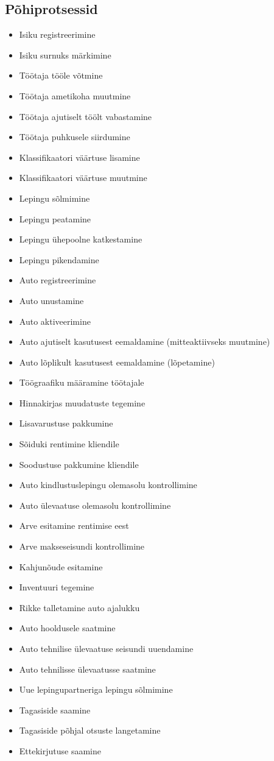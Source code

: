 \subsection{Põhiprotsessid}
\begin{itemize}
	\item Isiku registreerimine
	\item Isiku surnuks märkimine
	\item Töötaja tööle võtmine
	\item Töötaja ametikoha muutmine
	\item Töötaja ajutiselt töölt vabastamine
	\item Töötaja puhkusele siirdumine
	\item Klassifikaatori väärtuse lisamine
	\item Klassifikaatori väärtuse muutmine
	\item Lepingu sõlmimine
	\item Lepingu peatamine
	\item Lepingu ühepoolne katkestamine
	\item Lepingu pikendamine
	\item Auto registreerimine
	\item Auto unustamine
	\item Auto aktiveerimine
	\item Auto ajutiselt kasutusest eemaldamine (mitteaktiivseks muutmine)
	\item Auto lõplikult kasutusest eemaldamine (lõpetamine)
	\item Töögraafiku määramine töötajale
	\item Hinnakirjas muudatuste tegemine
	\item Lisavarustuse pakkumine 
	\item Sõiduki rentimine kliendile
	\item Soodustuse pakkumine kliendile
	\item Auto kindlustuslepingu olemasolu kontrollimine
	\item Auto ülevaatuse olemasolu kontrollimine
	\item Arve esitamine rentimise eest
	\item Arve makseseisundi kontrollimine
	\item Kahjunõude esitamine
	\item Inventuuri tegemine
	\item Rikke talletamine auto ajalukku
	\item Auto hooldusele saatmine
	\item Auto tehnilise ülevaatuse seisundi uuendamine
	\item Auto tehnilisse ülevaatusse saatmine
	\item Uue lepingupartneriga lepingu sõlmimine
	\item Tagasiside saamine
	\item Tagasiside põhjal otsuste langetamine
	\item Ettekirjutuse saamine
\end{itemize}


